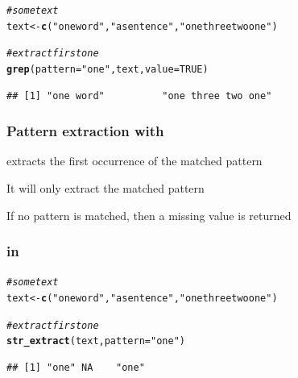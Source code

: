 \documentclass[12pt]{beamer}\usepackage[]{graphicx}\usepackage[]{color}
\makeatletter
\newcommand{\hlnum}[1]{\textcolor[rgb]{0.686,0.059,0.569}{#1}}%
\newcommand{\hlstr}[1]{\textcolor[rgb]{0.192,0.494,0.8}{#1}}%
\newcommand{\hlcom}[1]{\textcolor[rgb]{0.678,0.584,0.686}{\textit{#1}}}%
\newcommand{\hlstd}[1]{\textcolor[rgb]{0.345,0.345,0.345}{#1}}%
\newcommand{\hlkwb}[1]{\textcolor[rgb]{0.69,0.353,0.396}{#1}}%
\newcommand{\hlkwc}[1]{\textcolor[rgb]{0.333,0.667,0.333}{#1}}%
\newcommand{\hlkwd}[1]{\textcolor[rgb]{0.737,0.353,0.396}{\textbf{#1}}}%
\newenvironment{kframe}{%
 \def\at@end@of@kframe{}%
 \ifinner\ifhmode%
  \def\at@end@of@kframe{\end{minipage}}%
  \begin{minipage}{\columnwidth}%
 \fi\fi%
 \def\FrameCommand##1{\hskip\@totalleftmargin \hskip-\fboxsep
 \colorbox{shadecolor}{##1}\hskip-\fboxsep
     \hskip-\linewidth \hskip-\@totalleftmargin \hskip\columnwidth}%
 \MakeFramed {\advance\hsize-\width
   \@totalleftmargin\z@ \linewidth\hsize
   \@setminipage}}%
 {\par\unskip\endMakeFramed%
 \at@end@of@kframe}
\newenvironment{knitrout}{}{} %
\makeatother
\begin{document}

\begin{frame}[fragile]
\frametitle{}

\begin{knitrout}\footnotesize
{}\color{fgcolor}\begin{kframe}
\begin{alltt}
\hlcom{# some text}
\hlstd{text} \hlkwb{<-} \hlkwd{c}\hlstd{(}\hlstr{"one word"}\hlstd{,} \hlstr{"a sentence"}\hlstd{,} \hlstr{"one three two one"}\hlstd{)}

\hlcom{# extract first one}
\hlkwd{grep}\hlstd{(}\hlkwc{pattern} \hlstd{=} \hlstr{"one"}\hlstd{, text,} \hlkwc{value} \hlstd{=} \hlnum{TRUE}\hlstd{)}
\end{alltt}
\begin{verbatim}
## [1] "one word"          "one three two one"
\end{verbatim}
\end{kframe}
\end{knitrout}

\end{frame}


\begin{frame}[fragile]
\frametitle{Pattern extraction with }

\bbi
  \item {\hilit {}} extracts the first occurrence of the matched pattern
  \item It will only extract the matched pattern
  \item If no pattern is matched, then a missing value is returned
\ei

\end{frame}


\begin{frame}[fragile]
\frametitle{ in }

\begin{knitrout}\footnotesize
{}\color{fgcolor}\begin{kframe}
\begin{alltt}
\hlcom{# some text}
\hlstd{text} \hlkwb{<-} \hlkwd{c}\hlstd{(}\hlstr{"one word"}\hlstd{,} \hlstr{"a sentence"}\hlstd{,} \hlstr{"one three two one"}\hlstd{)}

\hlcom{# extract first one}
\hlkwd{str_extract}\hlstd{(text,} \hlkwc{pattern} \hlstd{=} \hlstr{"one"}\hlstd{)}
\end{alltt}
\begin{verbatim}
## [1] "one" NA    "one"
\end{verbatim}
\end{kframe}
\end{knitrout}

\end{frame}
\end{document}

